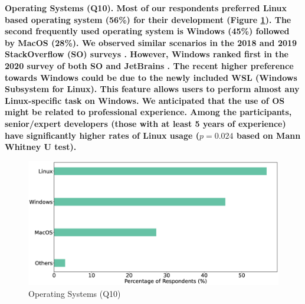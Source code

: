 \bf{Operating Systems (Q10).} Most of our
respondents preferred Linux based operating system (56\%) for their development (Figure \ref{fig:os}). The second frequently used
operating system is Windows (45\%) followed by MacOS (28\%). We
observed similar scenarios in the 2018 and 2019 StackOverflow (SO) surveys
\citep{StackoverflowSurvey2018,StackoverflowSurvey2019}. However, Windows ranked
first in the 2020 survey of both SO and JetBrains \citep{StackoverflowSurvey2020,
JetBrains2020}. The recent higher preference towards Windows could be due to the newly
included WSL (Windows Subsystem for Linux). This feature allows users to perform
almost any Linux-specific task on Windows. We anticipated that the use of OS
might be related to professional experience. Among the participants,
senior/expert developers (those with at least 5 years of experience) have significantly higher rates of Linux usage ($p=0.024$ based on Mann Whitney U test). 
\begin{figure}[h]
\centering
  \includegraphics[scale=0.17]{Figures/Respondents_os}
  \caption{Operating Systems (Q10)}
  \label{fig:os}
\end{figure}

